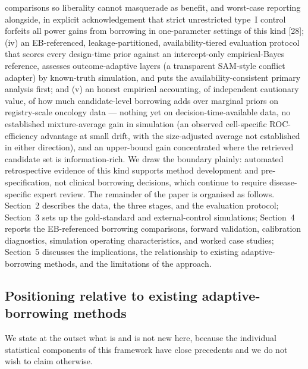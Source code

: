 \documentclass[11pt]{article}
\begin{document}
comparisons so liberality cannot masquerade as benefit, and worst-case
reporting alongside, in explicit acknowledgement that strict unrestricted
type~I control forfeits all power gains from borrowing in one-parameter
settings of this kind [28];
(iv) an EB-referenced, leakage-partitioned, availability-tiered evaluation
protocol that scores every design-time prior against an intercept-only
empirical-Bayes reference, assesses outcome-adaptive layers (a transparent
SAM-style conflict adapter) by known-truth simulation, and puts the
availability-consistent primary analysis first; and
(v) an honest empirical accounting, of independent cautionary value, of how
much candidate-level borrowing adds over marginal priors on registry-scale
oncology data --- nothing yet on decision-time-available data, no
established mixture-average gain in simulation (an observed cell-specific
ROC-efficiency advantage at small drift, with the size-adjusted average
not established in either direction), and an upper-bound gain
concentrated where the
retrieved candidate set is information-rich. We draw the
boundary plainly: automated retrospective evidence of this kind supports method
development and pre-specification, not clinical borrowing decisions, which
continue to require disease-specific expert review. The remainder of the paper
is organised as follows. Section~2 describes the data, the three stages, and
the evaluation protocol; Section~3 sets up the gold-standard and
external-control simulations; Section~4 reports the EB-referenced borrowing
comparisons, forward validation, calibration diagnostics, simulation operating
characteristics, and worked case studies; Section~5 discusses the
implications, the relationship to existing adaptive-borrowing methods, and the
limitations of the approach.


\subsection*{Positioning relative to existing adaptive-borrowing methods}

We state at the outset what is and is not new here, because the individual
statistical components of this framework have close precedents and we do not
wish to claim otherwise.
\end{document}
